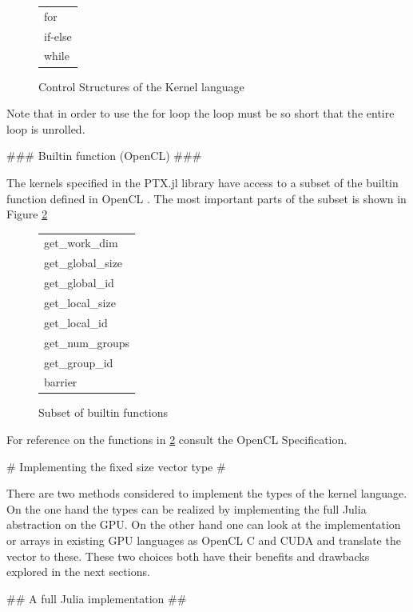 \begin{markdown}
\begin{figure}[H]
  \centering
  \begin{tabular}{|l|}
  \hline
  for\\
  if-else\\
  while\\
  \hline
  \end{tabular}
  \caption{Control Structures of the Kernel language}
  \label{tab:control}
\end{figure}

Note that in order to use the for loop the loop must be so short that
the entire loop is unrolled. 

### Builtin function (OpenCL) ###
\label{sec:meth:builtins}

The kernels specified in the PTX.jl library have access to a subset of
the builtin function defined in OpenCL \cite{opencl}. The most
important parts of the subset is shown in Figure \ref{fig:meth:builtins}

\begin{figure}[H]
  \centering
  \begin{tabular}{|l|}
    \hline
    get\_work\_dim\\
    get\_global\_size\\
    get\_global\_id\\
    get\_local\_size\\
    get\_local\_id\\
    get\_num\_groups\\
    get\_group\_id\\
    barrier\\
    \hline
  \end{tabular}
  \caption{Subset of builtin functions}
  \label{fig:meth:builtins}
\end{figure}

For reference on the functions in \ref{fig:meth:builtins} consult the OpenCL Specification.

# Implementing the fixed size vector type #

There are two methods considered to implement the types of the kernel
language. On the one hand the types can be realized by implementing
the full Julia abstraction on the GPU. On the other hand one can look
at the implementation or arrays in existing GPU languages as OpenCL C
and CUDA and translate the vector to these. These two choices both
have their benefits and drawbacks explored in the next sections.

## A full Julia implementation ##


\end{markdown}
